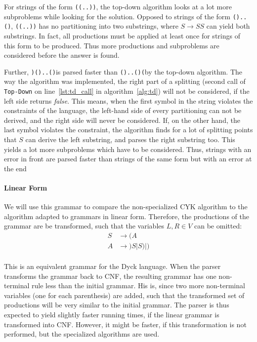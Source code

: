 For strings of the form \texttt{((..))}, the top-down algorithm looks at a lot more subproblems while looking for the solution.
Opposed to strings of the form \texttt{()..()}, \texttt{((..))} has no partitioning into two substrings, where $S\rightarrow SS$ can yield both substrings.
In fact, all productions must be applied at least once for strings of this form to be produced.
Thus more productions and subproblems are considered before the answer is found.

Further, \texttt{)()..()}is parsed faster than \texttt{()..()(}by the top-down algorithm.
The way the algorithm was implemented, the right part of a splitting (second call of \texttt{Top-Down} on line~\ref{lst:td_call} in algorithm~\ref{alg:td}) will not be considered, if the left side returns \textit{false}.
This means, when the first symbol in the string violates the constraints of the language, the left-hand side of every partitioning can not be derived, and the right side will never be considered.
If, on the other hand, the last symbol violates the constraint, the algorithm finds for a lot of splitting points that $S$ can derive the left substring, and parses the right substring too.
This yields a lot more subproblems which have to be considered.
Thus, strings with an error in front are parsed faster than strings of the same form but with an error at the end


\paragraph{Linear Form}
\label{par:dyck_linear}
We will use this grammar to compare the non-specialized CYK algorithm to the algorithm adapted to grammars in linear form.
Therefore, the productions of the grammar are be transformed, such that the variables $L,R\in V$ can be omitted:
\begin{align*}
    S&\rightarrow (A\\
    A&\rightarrow )S|S)|)\\
\end{align*}

This is an equivalent grammar for the Dyck language.
When the parser transforms the grammar back to CNF, the resulting grammar has one non-terminal rule less than the initial grammar.
His is, since two more non-terminal variables (one for each parenthesis) are added, such that the transformed set of productions will be very similar to the initial grammar.
The parser is thus expected to yield slightly faster running times, if the linear grammar is transformed into CNF.
However, it might be faster, if this transformation is not performed, but the specialized algorithms are used.

